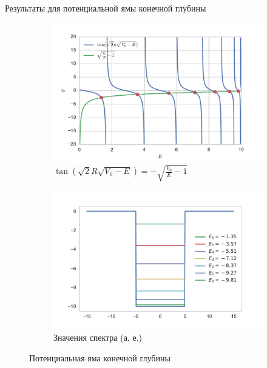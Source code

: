 \documentclass{beamer}
\begin{document}
\begin{frame}{Результаты для потенциальной ямы конечной глубины}

\begin{figure}[h!]
\centering
\begin{subfigure}{.5\textwidth}
  \centering
  \includegraphics[width=1.0\linewidth]{tan-sqrt.pdf}
  \caption{$\tan(\sqrt{2} R \sqrt{V_0-E})=-\sqrt{\frac{V_0}{E}-1}$}
  \label{fig1:tan-sqrt}
\end{subfigure}%
\begin{subfigure}{.5\textwidth}
  \centering
  \includegraphics[width=1.0\linewidth]{ens_finite.pdf}
  \caption{Значения спектра (а. е.)}
  \label{fig:finite_well_sol}
\end{subfigure}
\caption{Потенциальная яма конечной глубины}
\label{fig:fin_well}
\end{figure}
  
\end{frame}
\end{document}
